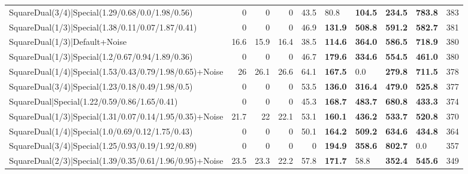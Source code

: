 \begin{tabular}{lrrrrllllr}
 SquareDual(3/4)|Special(1.29/0.68/0.0/1.98/0.56)        &          0   &          0   &          0   &            43.5 & 80.8           & \textbf{104.5} & \textbf{234.5} & \textbf{783.8}  &          383 \\
 SquareDual(1/3)|Special(1.38/0.11/0.07/1.87/0.41)       &          0   &          0   &          0   &            46.9 & \textbf{131.9} & \textbf{508.8} & \textbf{591.2} & \textbf{582.7}  &          381 \\
 SquareDual(1/3)|Default+Noise                           &         16.6 &         15.9 &         16.4 &            38.5 & \textbf{114.6} & \textbf{364.0} & \textbf{586.5} & \textbf{718.9}  &          380 \\
 SquareDual(1/3)|Special(1.2/0.67/0.94/1.89/0.36)        &          0   &          0   &          0   &            46.7 & \textbf{179.6} & \textbf{334.6} & \textbf{554.5} & \textbf{461.0}  &          380 \\
 SquareDual(1/4)|Special(1.53/0.43/0.79/1.98/0.65)+Noise &         26   &         26.1 &         26.6 &            64.1 & \textbf{167.5} & 0.0            & \textbf{279.8} & \textbf{711.5}  &          378 \\
 SquareDual(3/4)|Special(1.23/0.18/0.49/1.98/0.5)        &          0   &          0   &          0   &            53.5 & \textbf{136.0} & \textbf{316.4} & \textbf{479.0} & \textbf{525.8}  &          377 \\
 SquareDual|Special(1.22/0.59/0.86/1.65/0.41)            &          0   &          0   &          0   &            45.3 & \textbf{168.7} & \textbf{483.7} & \textbf{680.8} & \textbf{433.3}  &          374 \\
 SquareDual(1/3)|Special(1.31/0.07/0.14/1.95/0.35)+Noise &         21.7 &         22   &         22.1 &            53.1 & \textbf{160.1} & \textbf{436.2} & \textbf{533.7} & \textbf{520.8}  &          370 \\
 SquareDual(1/4)|Special(1.0/0.69/0.12/1.75/0.43)        &          0   &          0   &          0   &            50.1 & \textbf{164.2} & \textbf{509.2} & \textbf{634.6} & \textbf{434.8}  &          364 \\
 SquareDual(3/4)|Special(1.25/0.93/0.19/1.92/0.89)       &          0   &          0   &          0   &             0   & \textbf{194.9} & \textbf{358.6} & \textbf{802.7} & 0.0             &          357 \\
 SquareDual(2/3)|Special(1.39/0.35/0.61/1.96/0.95)+Noise &         23.5 &         23.3 &         22.2 &            57.8 & \textbf{171.7} & 58.8           & \textbf{352.4} & \textbf{545.6}  &          349 \\

\end{tabular}
